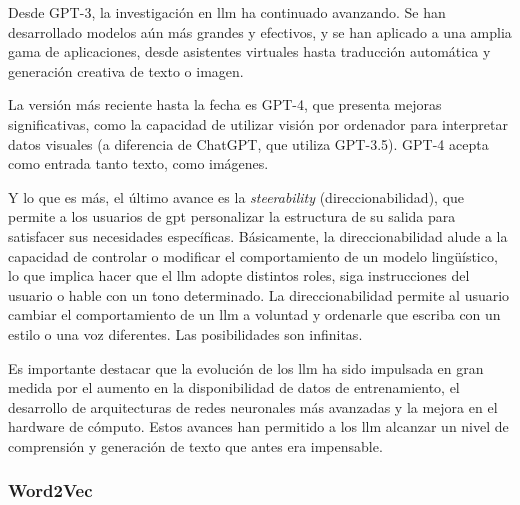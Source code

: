 \begin{description}
Desde GPT-3, la investigación en \acrshort{llm} ha continuado avanzando. Se han desarrollado modelos aún más grandes y efectivos, y se han aplicado a una amplia gama de aplicaciones, desde asistentes virtuales hasta traducción automática y generación creativa de texto o imagen.

La versión más reciente hasta la fecha es GPT-4, que presenta mejoras significativas, como la capacidad de utilizar visión por ordenador para interpretar datos visuales (a diferencia de ChatGPT, que utiliza GPT-3.5). GPT-4 acepta como entrada tanto texto, como imágenes. 

Y lo que es más, el último avance es la \textit{steerability} (direccionabilidad), que permite a los usuarios de \acrshort{gpt} personalizar la estructura de su salida para satisfacer sus necesidades específicas. Básicamente, la direccionabilidad alude a la capacidad de controlar o modificar el comportamiento de un modelo lingüístico, lo que implica hacer que el \acrshort{llm} adopte distintos roles, siga instrucciones del usuario o hable con un tono determinado. La direccionabilidad permite al usuario cambiar el comportamiento de un \acrshort{llm} a voluntad y ordenarle que escriba con un estilo o una voz diferentes. Las posibilidades son infinitas.

\end{description}


Es importante destacar que la evolución de los \acrshort{llm} ha sido impulsada en gran medida por el aumento en la disponibilidad de datos de entrenamiento, el desarrollo de arquitecturas de redes neuronales más avanzadas y la mejora en el hardware de cómputo. Estos avances han permitido a los \acrshort{llm} alcanzar un nivel de comprensión y generación de texto que antes era impensable.

\subsubsection{Word2Vec}

